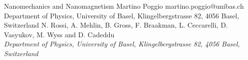 \begin{conf-abstract}[]
{Nanomechanics and Nanomagnetism}
{\color{blue} Martino Poggio}
{martino.poggio@unibas.ch}
{Department of Physics, University of Basel, Klingelbergstrasse 82, 4056 Basel, Switzerland}
{{\color{blue}N. Rossi, A. Mehlin, B. Gross, F. Braakman, L. Ceccarelli, D. Vasyukov, M. Wyss and D. Cadeddu}\\ \textit{Department of Physics, University of Basel, Klingelbergstrasse 82, 4056 Basel, Switzerland}\\ 
\decofourleft \decofourright}





\printbibliography[heading=none]

\end{conf-abstract}
